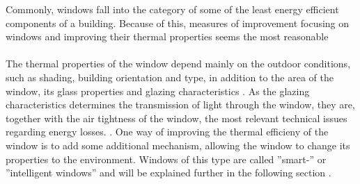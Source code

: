 Commonly, windows fall into the category of some of the least energy efficient components of a building.
Because of this, measures of improvement focusing on windows and improving their thermal properties 
seems the most reasonable
\cite{Baetens2010} 
%
\\
\\
The thermal properties of the window depend mainly on
the outdoor conditions, such as shading, building orientation and type, in addition to the
area of the window, its glass properties and glazing characteristics \cite{Hassouneh2010}. 
As the glazing characteristics determines the transmission of light through the window, they are, together
with the air tightness of the window, the most relevant technical issues regarding energy losses.
 \cite{Tarantini2011}.%
%
One way of improving the thermal efficieny of the window is to add some additional mechanism,
allowing the window to change its properties to the environment. 
Windows of this type are called ''smart-'' or ''intelligent windows'' and will be explained further
in the following section
\cite{Kamalisarvestani2013}. %


